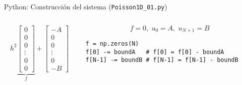 \documentclass[handout]{beamer}
\begin{document}
\begin{frame}[fragile]{Python: Construcci\'on del sistema (\texttt{Poisson1D\_01.py})}
\begin{columns}
	\begin{column}{0.5\textwidth}
{\footnotesize 		\[
		h^2 \underbrace{\left[
		\begin{matrix}
		0 \\ 0 \\ 0 \\ \vdots \\ 0 \\ 0
		\end{matrix}
		\right]}_f +
		\left[
		\begin{matrix}
		-A \\ 0 \\ 0 \\ \vdots \\ 0 \\ -B
		\end{matrix}
		\right]
		\]}
	\end{column}
	\begin{column}{0.5\textwidth}  %
\[
f = 0, \,\, u_0 = A, \,\, u_{N+1} = B
\]		

\begin{lstlisting}
f = np.zeros(N)
f[0] -= boundA   # f[0] = f[0] - boundA 
f[N-1] -= boundB # f[N-1] = f[N-1] - boundB	
\end{lstlisting}

	\end{column}
\end{columns}

\end{frame}
\end{document}
